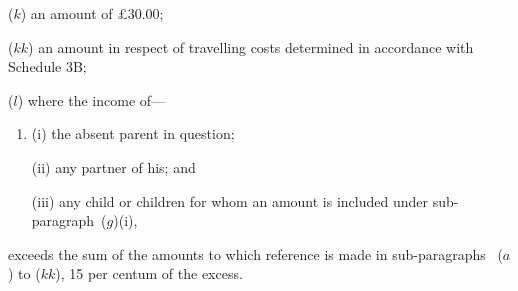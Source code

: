 \documentclass[12pt,a4paper]{article}
\begin{document}
\begin{enumerate}
($k$) an amount of 
£30$.$00; %

($kk$) an amount in respect of travelling costs determined in accordance with Schedule 3B;

($l$) where the income of—
\begin{enumerate}\item[]
(i) the absent parent in question;

(ii) any partner of his; and

(iii) any child or children for whom an amount is included under sub-paragraph~($g$)(i),
\end{enumerate}
exceeds the sum of the amounts to which reference is made in sub-paragraphs~
($a$) to ($kk$),  %
15 per centum %
of the excess.
\end{enumerate}
\end{document}
